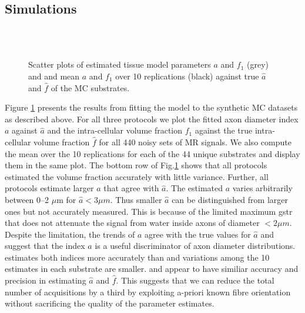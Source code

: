 \subsection*{Simulations}
\begin{figure}
\centering
		\\
		\\
		 
  \caption{Scatter plots of estimated tissue model parameters $a$ and $f_1$ (grey) and and mean $a$ and $f_1$ over 10 replications (black) against true $\hat{a}$ and $\hat{f}$ of the MC substrates.}
  \label{fig:experiment4:mc simulations}
\end{figure}
Figure \ref{fig:experiment4:mc simulations} presents the results from fitting the model to the synthetic MC datasets as described above. For all three protocols we plot the fitted axon diameter index $a$ against $\hat{a}$ and the intra-cellular volume fraction $f_1$ against the true intra-cellular volume fraction $\hat{f}$ for all 440 noisy sets of MR signals. We also compute the mean over the 10 replications for each of the 44 unique substrates and display them in the same plot. The bottom row of Fig.\ref{fig:experiment4:mc simulations} shows that all protocols estimated the volume fraction accurately with little variance. Further, all protocols estimate larger $a$ that agree with $\hat{a}$. The estimated $a$ varies arbitrarily between 0--2 $\mu$m for $\hat{a} < 3\mu m$. Thus smaller $\hat{a}$ can be distinguished from larger ones but not accurately measured. This is because of the limited maximum {\gls{gstr}} that does not attenuate the signal from water inside axons of diameter $<2\mu m$. Despite the limitation, the trends of $a$ agree with the true
values for $\hat{a}$ and suggest that the index $a$ is a useful discriminator of axon diameter distributions. \SFlong{} estimates both indices more accurately than \OIlong{} and variations among the 10 estimates in each substrate are smaller. \SFshort{} and \OIlong{} appear to have similiar accuracy and precision in estimating $\hat{a}$ and $\hat{f}$. This suggests that we can reduce the total number of acquisitions by a third by exploiting a-priori known fibre orientation without sacrificing the quality of the parameter estimates.

